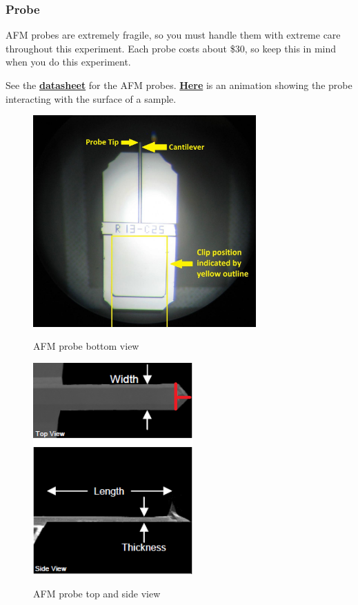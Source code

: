 \documentclass{../lab}
\begin{document}
\subsubsection{Probe}

AFM probes are extremely fragile, so you must handle them with extreme care throughout this experiment. Each probe costs about \$30, so keep this in mind when you do this experiment.

See the \href{http://experimentationlab.berkeley.edu/sites/default/files/AFMImages/ACLA\_4\_datasheet.pdf}{\textbf{datasheet}} for the AFM probes. \href{http://experimentationlab.berkeley.edu/sites/default/files/AFMImages/1.1.\%20Generating\%20an\%20image.flv\_converted.mp4}{\textbf{Here}} is an animation showing the probe interacting with the surface of a sample.

\begin{figure}[H]
\centering
  \href{http://experimentationlab.berkeley.edu/sites/default/files/AFMImages/AFMprobe.JPG}{\includegraphics[height=230pt,keepaspectratio]{images/AFMprobe.JPG}}
  \caption{AFM probe bottom view}
  \label{fig:AFMProbe}
\endminipage\hfill
{}
\centering
  \href{http://experimentationlab.berkeley.edu/sites/default/files/AFMImages/26.png}{\includegraphics[height=230pt,keepaspectratio]{images/26.png}}
  \caption{AFM probe top and side view}
  \label{fig:AFMProbe2}
\endminipage
\end{figure}
\end{document}
